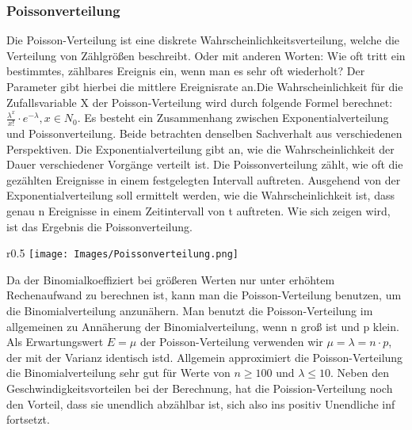 \documentclass{scrreprt}
\begin{document}
\subsubsection{Poissonverteilung}\label{Poissonverteilung}
Die Poisson-Verteilung ist eine diskrete Wahrscheinlichkeitsverteilung, welche die Verteilung von Zählgrößen beschreibt. Oder mit anderen Worten: Wie oft tritt ein bestimmtes, zählbares Ereignis ein, wenn man es sehr oft wiederholt? Der Parameter gibt hierbei die mittlere Ereignisrate an.Die Wahrscheinlichkeit für die Zufallsvariable X der Poisson-Verteilung wird durch folgende Formel berechnet: $\frac{\lambda^x}{x!}\cdot e^{-\lambda}, x\in N_0$. Es besteht ein Zusammenhang zwischen Exponentialverteilung und Poissonverteilung. Beide betrachten denselben Sachverhalt aus verschiedenen Perspektiven. Die Exponentialverteilung gibt an, wie die Wahrscheinlichkeit der Dauer verschiedener Vorgänge verteilt ist. Die Poissonverteilung zählt, wie oft die gezählten Ereignisse in einem festgelegten Intervall auftreten. Ausgehend von der Exponentialverteilung soll ermittelt werden, wie die Wahrscheinlichkeit ist, dass genau n Ereignisse in einem Zeitintervall von t auftreten. Wie sich zeigen wird, ist das Ergebnis die Poissonverteilung.
\begin{wrapfigure}{r}{0.5\textwidth}
    \centering
    \texttt{[image: Images/Poissonverteilung.png]}
    \caption{}
   \label{Figur 9}
\end{wrapfigure}
Da der Binomialkoeffiziert bei größeren Werten nur unter erhöhtem Rechenaufwand zu berechnen ist, kann man die Poisson-Verteilung benutzen, um die Binomialverteilung anzunähern. Man benutzt die Poisson-Verteilung im allgemeinen zu Annäherung der Binomialverteilung, wenn n groß ist und p klein. Als Erwartungswert $E=\mu$ der Poisson-Verteilung verwenden wir $\mu=\lambda=n \cdot p$, der mit der Varianz identisch istd.
Allgemein approximiert die Poisson-Verteilung die Binomialverteilung sehr gut für Werte von $n \geq 100$ und $\lambda \leq 10$. Neben den Geschwindigkeitsvorteilen bei der Berechnung, hat die Poission-Verteilung noch den Vorteil, dass sie unendlich abzählbar ist, sich also ins positiv Unendliche inf fortsetzt.
\end{document}
